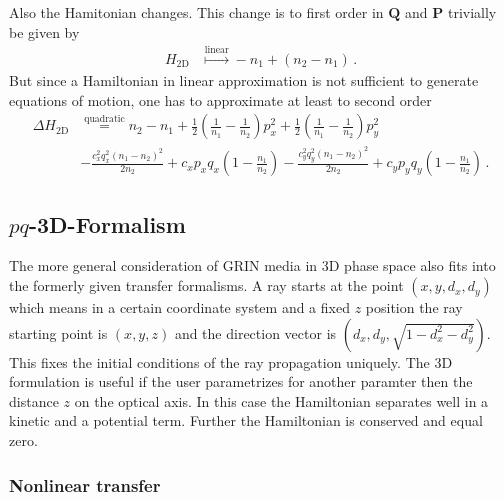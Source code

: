 \documentclass[12pt,a4paper,twoside,openright,BCOR10mm,headsepline,titlepage,abstracton,chapterprefix,final]{scrreprt}
\newcommand\Vector[1]{{\mathbf{#1}}}
\begin{document}
Also the Hamitonian changes. This change is to first order in $\Vector{Q}$ and $\Vector{P}$ trivially
be given by
\begin{align}
 H_\text{2D} & \stackrel{\text{linear}}{\mapsto} -n_1 + (n_2 - n_1)\,.
\end{align}
But since a Hamiltonian in linear approximation is not sufficient to generate equations of motion,
one has to approximate at least to second order
\begin{align}
 \Delta H_\text{2D} &\stackrel{\text{quadratic}}{=} n_2-n_1
   +\frac{1}{2} \left(\frac{1}{n_1}-\frac{1}{n_2}\right) p_x^2
   + \frac{1}{2}  \left(\frac{1}{n_1}-\frac{1}{n_2}\right) p_y^2 \nonumber\\&
  -\frac{c_x^2 q_x^2 (n_1-n_2)^2}{2 n_2}+c_x p_x q_x \left(1-\frac{n_1}{n_2}\right)
   -\frac{c_y^2 q_y^2 (n_1-n_2)^2}{2 n_2}+c_y p_y q_y \left(1-\frac{n_1}{n_2}\right)
\,.
\end{align}


\subsection{\texorpdfstring{$pq$}{pq}-3D-Formalism}

The more general consideration of GRIN media in 3D phase space also fits into the formerly given transfer formalisms.
A ray starts at the point $(x,y,d_x,d_y)$ which means in a certain coordinate system
and a fixed $z$ position the ray starting point is $(x,y,z)$ and the direction vector
is $(d_x,d_y,\sqrt{1-d_x^2-d_y^2})$. This fixes the initial conditions of the ray propagation
uniquely. The 3D formulation is useful if the user parametrizes for another paramter then the distance $z$ on the optical
axis. In this case the Hamiltonian separates well in a kinetic and a potential term. Further the Hamiltonian is conserved and
equal zero.

\subsubsection{Nonlinear transfer}
\end{document}
